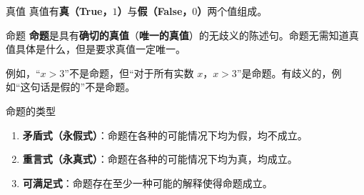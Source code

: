 
\begin{definition}{真值}
真值有\textbf{真（True，$1$）}与\textbf{假（False，$0$）}两个值组成。
\end{definition}

\begin{definition}{命题}
\textbf{命题}是具有\textbf{确切的真值}（\textbf{唯一的真值}）的无歧义的陈述句。命题无需知道真值具体是什么，但是要求真值一定唯一。
\end{definition}
例如，“$x>3$”不是命题，但“对于所有实数 $x$，$x>3$”是命题。有歧义的，例如“这句话是假的”不是命题。

\begin{definition}{命题的类型}
\begin{enumerate}
\item \textbf{矛盾式（永假式）}：命题在各种的可能情况下均为假，均不成立。
\item \textbf{重言式（永真式）}：命题在各种的可能情况下均为真，均成立。
\item \textbf{可满足式}：命题存在至少一种可能的解释使得命题成立。
\end{enumerate}

\end{definition}